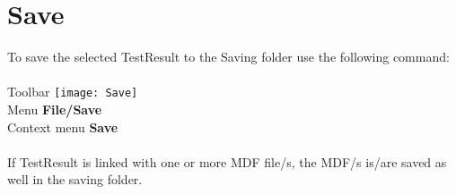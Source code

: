 \chapter{Save}

To save the selected TestResult to the Saving folder use the following command:
\\\\
Toolbar \textrightarrow \texttt{[image: Save]}\\
Menu \textrightarrow \textbf{File/Save}\\
Context menu \textrightarrow  \textbf{Save}
\\\\
If TestResult is linked with one or more MDF file/s, the MDF/s is/are saved as well in the saving folder.


\clearpage